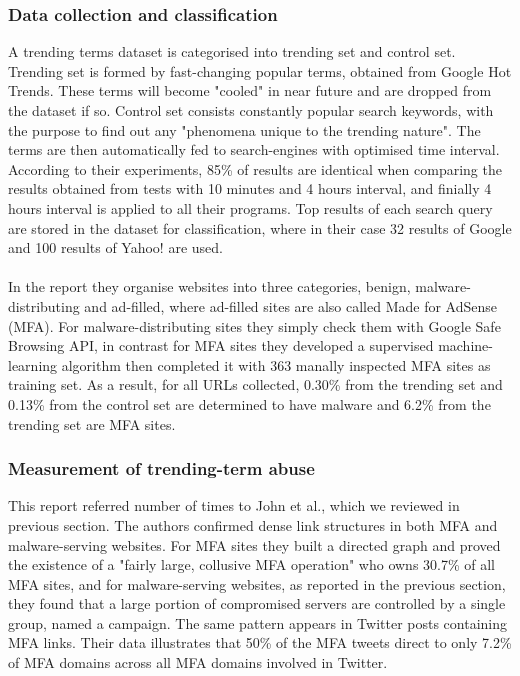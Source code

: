 \subsubsection{Data collection and classification}
A trending terms dataset is categorised into trending set and control set. 
Trending set is formed by fast-changing popular terms, obtained from Google 
Hot Trends. These terms will become "cooled" in near future and are dropped 
from the dataset if so. Control set consists constantly popular search 
keywords, with the purpose to find out any "phenomena unique to the trending 
nature". The terms are then automatically fed to search-engines with optimised 
time interval. According to their experiments, 85\% of results are identical 
when comparing the results obtained from tests with 10 minutes and 4 hours 
interval, and finially 4 hours interval is applied to all their programs. Top 
results of each search query are stored in the dataset for classification, 
where in their case 32 results of Google and 100 results of Yahoo! are used.
\paragraph{}
In the report they organise websites into three categories, benign, 
malware-distributing and ad-filled, where ad-filled sites are also called Made 
for AdSense (MFA). For malware-distributing sites they simply check them with 
Google Safe Browsing API, in contrast for MFA sites they developed a 
supervised machine-learning algorithm then completed it with 363 manally 
inspected MFA sites as training set. As a result, for all URLs collected, 
0.30\% from the trending set and 0.13\% from the control set are determined to 
have malware and 6.2\% from the trending set are MFA sites. 
\subsubsection*{Measurement of trending-term abuse}
This report referred number of times to John et al.\cite{deseo}, which we 
reviewed in previous section. The authors confirmed dense link structures in 
both MFA and malware-serving websites. For MFA sites they built a directed 
graph and proved the existence of a "fairly large, collusive MFA operation" 
who owns 30.7\% of all MFA sites, and for malware-serving websites, as 
reported in the previous section, they found that a large portion of 
compromised servers are controlled by a single group, named a campaign. The 
same pattern appears in Twitter posts containing MFA links. Their data 
illustrates that 50\% of the MFA tweets direct to only 7.2\% of MFA domains 
across all MFA domains involved in Twitter. 

